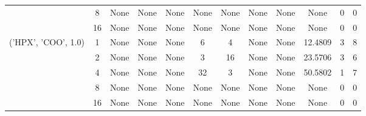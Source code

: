 \begin{tabular}{cccccccccccc}
& 8& None& None& None& None& None& None& None& None& 0& 0\\
& 16& None& None& None& None& None& None& None& None& 0& 0\\
\hline
\multirow{5}{*}{('HPX', 'COO', 1.0)}& 1& None& None& None& 6& 4& None& None& 12.4809& 3& 8\\
& 2& None& None& None& 3& 16& None& None& 23.5706& 3& 6\\
& 4& None& None& None& 32& 3& None& None& 50.5802& 1& 7\\
& 8& None& None& None& None& None& None& None& None& 0& 0\\
& 16& None& None& None& None& None& None& None& None& 0& 0\\
\hline
\end{tabular}



